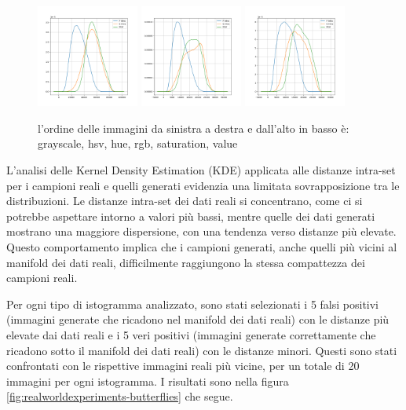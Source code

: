 \begin{figure}[!ht]
    \centering
    \includegraphics[width=0.3\textwidth]{../images/realworldexperiments/butterflies/kde/kde_rgb_histogram.png}
    \includegraphics[width=0.3\textwidth]{../images/realworldexperiments/butterflies/kde/kde_saturation_histogram.png}
    \includegraphics[width=0.3\textwidth]{../images/realworldexperiments/butterflies/kde/kde_value_histogram.png}
    \caption{l'ordine delle immagini da sinistra a destra e dall'alto in basso è: grayscale, hsv, hue, rgb, saturation, value}
\end{figure}

L'analisi delle Kernel Density Estimation (KDE) applicata alle distanze intra-set per i campioni reali e quelli generati evidenzia una limitata sovrapposizione tra le distribuzioni. Le distanze intra-set dei dati reali si concentrano, come ci si potrebbe aspettare intorno a valori più bassi, mentre quelle dei dati generati mostrano una maggiore dispersione, con una tendenza verso distanze più elevate. Questo comportamento implica che i campioni generati, anche quelli più vicini al manifold dei dati reali, difficilmente raggiungono la stessa compattezza dei campioni reali.

Per ogni tipo di istogramma analizzato, sono stati selezionati i 5 falsi positivi (immagini generate che ricadono nel manifold dei dati reali) con le distanze più elevate dai dati reali e i 5 veri positivi (immagini generate correttamente che ricadono sotto il manifold dei dati reali) con le distanze minori. Questi sono stati confrontati con le rispettive immagini reali più vicine, per un totale di 20 immagini per ogni istogramma. 
I risultati sono nella figura \ref{fig:realworldexperiments-butterflies} che segue.

